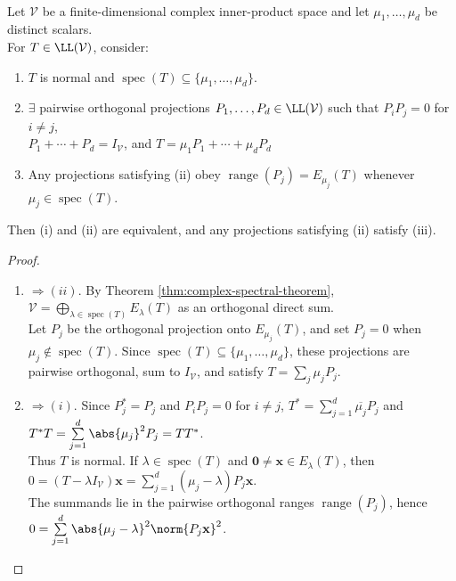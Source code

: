 \begin{theorem} \label{thm:spectral-resolution-normal-operator} \\
Let $\mathcal{V}$ be a finite-dimensional complex inner-product space and let $\mu_1,\ldots,\mu_d$ be distinct scalars.\\
For $T\in\LL(\mathcal{V})$, consider:
\begin{enumerate}[label=(\roman*)]
\setlength{\itemsep}{0pt}
\item $T$ is normal and $\operatorname{spec}(T)\subseteq\{\mu_1,\ldots,\mu_d\}$.
\item $\exists$ pairwise orthogonal projections $P_1,\ldots,P_d\in\LL(\mathcal{V})$ such that $P_iP_j=0$ for $i\neq j$,\\
$P_1+\cdots+P_d=I_{\mathcal{V}}$, and $T=\mu_1P_1+\cdots+\mu_dP_d$
\item Any projections satisfying (ii) obey $\operatorname{range}(P_j)=E_{\mu_j}(T)$ whenever $\mu_j\in\operatorname{spec}(T)$.
\end{enumerate}
Then (i) and (ii) are equivalent, and any projections satisfying (ii) satisfy (iii).
\begin{proof}
\begin{enumerate}[label=(\roman*).]
\setlength{\itemsep}{0pt}
\item[$(i)$] $\Rightarrow (ii)$. By Theorem \ref{thm:complex-spectral-theorem}, $\mathcal{V}=\bigoplus\limits_{\lambda\in\operatorname{spec}(T)}E_{\lambda}(T)$ as an orthogonal direct sum.\\
Let $P_j$ be the orthogonal projection onto $E_{\mu_j}(T)$, and set $P_j=0$ when $\mu_j\notin\operatorname{spec}(T)$. Since $\operatorname{spec}(T)\subseteq\{\mu_1,\ldots,\mu_d\}$, these projections are pairwise orthogonal, sum to $I_{\mathcal{V}}$, and satisfy $T=\sum_j\mu_jP_j$.
\item[$(ii)$] $\Rightarrow (i)$. Since $P_j^*=P_j$ and $P_iP_j=0$ for $i\neq j$, $T^*=\sum\limits_{j=1}^{d}\overline{\mu_j}P_j$ and $T^*T=\sum\limits_{j=1}^{d}\abs{\mu_j}^2P_j=TT^*$.\\
Thus $T$ is normal. If $\lambda\in\operatorname{spec}(T)$ and $\mathbf{0}\neq\mathbf{x}\in E_{\lambda}(T)$, then $0=(T-\lambda I_{\mathcal{V}})\mathbf{x} =\sum\limits_{j=1}^{d}(\mu_j-\lambda)P_j\mathbf{x}$.\\
The summands lie in the pairwise orthogonal ranges $\operatorname{range}(P_j)$, hence $0=\sum\limits_{j=1}^{d}\abs{\mu_j-\lambda}^2\norm{P_j\mathbf{x}}^2$.\\

\end{enumerate}
\end{proof}
\end{theorem}

